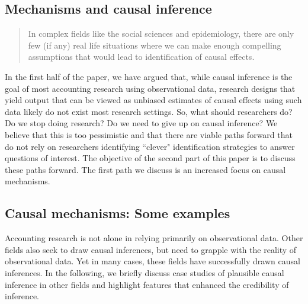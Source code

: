 \documentclass[11pt,reqno,titlepage]{amsart}
\begin{document}
\begin{doublespace}
\section{Mechanisms and causal inference} \label{sec:mech}

\begin{quotation}
\begin{singlespace} 
	\addtolength{\leftmargin}{.25in}
	\addtolength{\rightmargin}{.25in}
In complex fields like the social sciences and epidemiology, there are only few (if any) real life situations where we can make enough compelling assumptions that would lead to identification of causal effects.
\end{singlespace}
\end{quotation}

In the first half of the paper, we have argued that, while causal inference is the goal of most accounting research using observational data, research designs that yield output that can be viewed as unbiased estimates of causal effects using such data likely do not exist most research settings.
So, what should researchers do? Do we stop doing research? Do we need to give up on causal inference? 
We believe that this is too pessimistic and that there are viable paths forward that do not rely on researchers identifying ``clever" identification strategies to answer questions of interest.
The objective of the second part of this paper is to discuss these paths forward.
The first path we discuss is an increased focus on causal mechanisms.

\subsection{Causal mechanisms: Some examples}
Accounting research is not alone in relying primarily on observational data.
Other fields also seek to draw causal inferences, but need to grapple with the reality of observational data. 
Yet in many cases, these fields have successfully drawn causal inferences.
In the following, we briefly discuss case studies of plausible causal inference in other fields and highlight features that enhanced the credibility of inference.


\end{doublespace}
\end{document}

